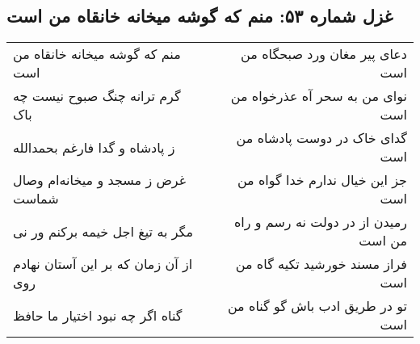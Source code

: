 \begin{center}
\section*{غزل شماره ۵۳: منم که گوشه میخانه خانقاه من است}
\label{sec:sh053}
\begin{longtable}{l p{0.5cm} r}
منم که گوشه میخانه خانقاه من است
&&
دعای پیر مغان ورد صبحگاه من است
\\
گرم ترانه چنگ صبوح نیست چه باک
&&
نوای من به سحر آه عذرخواه من است
\\
ز پادشاه و گدا فارغم بحمدالله
&&
گدای خاک در دوست پادشاه من است
\\
غرض ز مسجد و میخانه‌ام وصال شماست
&&
جز این خیال ندارم خدا گواه من است
\\
مگر به تیغ اجل خیمه برکنم ور نی
&&
رمیدن از در دولت نه رسم و راه من است
\\
از آن زمان که بر این آستان نهادم روی
&&
فراز مسند خورشید تکیه گاه من است
\\
گناه اگر چه نبود اختیار ما حافظ
&&
تو در طریق ادب باش گو گناه من است
\\
\end{longtable}
\end{center}
